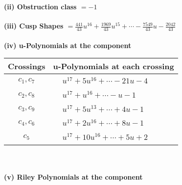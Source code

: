 \documentclass[1p]{elsarticle_modified}
\theoremstyle{definition}
\begin{document}
\flushleft \textbf{(ii) Obstruction class $= -1$}\\~\\
\flushleft \textbf{(iii) Cusp Shapes $= \frac{441}{43} u^{16}+\frac{1969}{43} u^{15}+\cdots-\frac{7549}{43} u-\frac{2042}{43}$}\\~\\
\newpage\renewcommand{\arraystretch}{1}
\flushleft \textbf{(iv) u-Polynomials at the component}\newline \\
\begin{tabular}{m{50pt}|m{274pt}}
Crossings & \hspace{64pt}u-Polynomials at each crossing \\
\hline $$\begin{aligned}c_{1},c_{7}\end{aligned}$$&$\begin{aligned}
&u^{17}+5 u^{16}+\cdots-21 u-4
\end{aligned}$\\
\hline $$\begin{aligned}c_{2},c_{8}\end{aligned}$$&$\begin{aligned}
&u^{17}+u^{16}+\cdots- u-1
\end{aligned}$\\
\hline $$\begin{aligned}c_{3},c_{9}\end{aligned}$$&$\begin{aligned}
&u^{17}+5 u^{13}+\cdots+4 u-1
\end{aligned}$\\
\hline $$\begin{aligned}c_{4},c_{6}\end{aligned}$$&$\begin{aligned}
&u^{17}+2 u^{16}+\cdots+8 u-1
\end{aligned}$\\
\hline $$\begin{aligned}c_{5}\end{aligned}$$&$\begin{aligned}
&u^{17}+10 u^{16}+\cdots+5 u+2
\end{aligned}$\\
\hline
\end{tabular}\\~\\
\newpage\renewcommand{\arraystretch}{1}
\flushleft \textbf{(v) Riley Polynomials at the component}\newline \\
\end{document}
